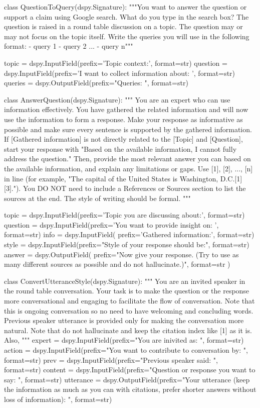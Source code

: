 \begin{prompt}
class QuestionToQuery(dspy.Signature):
    """You want to answer the question or support a claim using Google search. 
        What do you type in the search box?
        The question is raised in a round table discussion on a topic. The question may or may not focus on the topic itself.
        Write the queries you will use in the following format:
        - query 1
        - query 2
        ...
        - query n"""

    topic = dspy.InputField(prefix='Topic context:', format=str)
    question = dspy.InputField(prefix='I want to collect information about: ', format=str)
    queries = dspy.OutputField(prefix="Queries: \n", format=str)


class AnswerQuestion(dspy.Signature):
    """ You are an expert who can use information effectively. You have gathered the related information and will now use the information to form a response.
    Make your response as informative as possible and make sure every sentence is supported by the gathered information. 
    If [Gathered information] is not directly related to the [Topic] and [Question], start your response with "Based on the available information, I cannot fully address the question." Then, provide the most relevant answer you can based on the available information, and explain any limitations or gaps.
    Use [1], [2], ..., [n] in line (for example, "The capital of the United States is Washington, D.C.[1][3]."). 
    You DO NOT need to include a References or Sources section to list the sources at the end. The style of writing should be formal.
    """

    topic = dspy.InputField(prefix='Topic you are discussing about:', format=str)
    question = dspy.InputField(prefix='You want to provide insight on: ', format=str)
    info = dspy.InputField(
        prefix='Gathered information:\n', format=str)
    style = dspy.InputField(prefix="Style of your response should be:", format=str)
    answer = dspy.OutputField(
        prefix="Now give your response. (Try to use as many different sources as possible and do not hallucinate.)",
        format=str
    )

class ConvertUtteranceStyle(dspy.Signature):
    """
    You are an invited speaker in the round table conversation. 
    Your task is to make the question or the response more conversational and engaging to facilitate the flow of conversation.
    Note that this is ongoing conversation so no need to have welcoming and concluding words. Previous speaker utterance is provided only for making the conversation more natural.
    Note that do not hallucinate and keep the citation index like [1] as it is. Also,
    """
    expert = dspy.InputField(prefix="You are inivited as: ", format=str)
    action = dspy.InputField(prefix="You want to contribute to conversation by: ", format=str)
    prev = dspy.InputField(prefix="Previous speaker said: ", format=str)
    content = dspy.InputField(prefix="Question or response you want to say: ", format=str)
    utterance = dspy.OutputField(prefix="Your utterance (keep the information as much as you can with citations, prefer shorter answers without loss of information): ", format=str)
\end{prompt}